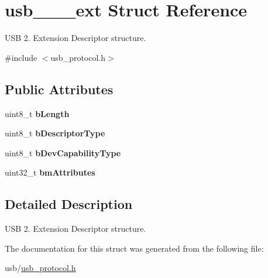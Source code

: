 \hypertarget{structusb__2__0__ext}{}\section{usb\+\_\+\_\+\_\+ext Struct Reference}
\label{structusb__2__0__ext}


U\+SB 2. Extension Descriptor structure.  




{\ttfamily \#include $<$usb\+\_\+protocol.\+h$>$}

\subsection*{Public Attributes}
\begin{DoxyCompactItemize}
\item 
\mbox{\label{structusb__2__0__ext_ac357a9d1d2a9b1047de012bf67a41fe6}} 
uint8\+\_\+t {\bfseries b\+Length}
\item 
\mbox{\label{structusb__2__0__ext_acd62a10079e5c778c372f7730dec6ee5}} 
uint8\+\_\+t {\bfseries b\+Descriptor\+Type}
\item 
\mbox{\label{structusb__2__0__ext_ac433b8d5e7c70ac099e9e5ef44bb1a1a}} 
uint8\+\_\+t {\bfseries b\+Dev\+Capability\+Type}
\item 
\mbox{\label{structusb__2__0__ext_aa98c6693a41b9d9025d2c5f645aa8521}} 
uint32\+\_\+t {\bfseries bm\+Attributes}
\end{DoxyCompactItemize}


\subsection{Detailed Description}
U\+SB 2. Extension Descriptor structure. 

The documentation for this struct was generated from the following file\+:\begin{DoxyCompactItemize}
\item 
usb/\hyperlink{usb__protocol_8h}{usb\+\_\+protocol.\+h}\end{DoxyCompactItemize}
